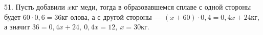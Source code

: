 51. Пусть добавили $x$кг меди, тогда в образовавшемся сплаве с одной стороны будет $60\cdot0,6=36$кг олова, а с другой стороны --- $(x+60)\cdot0,4=0,4x+24$кг, а значит $36=0,4x+24,\ 0,4x=12,\ x=30$кг.\\
